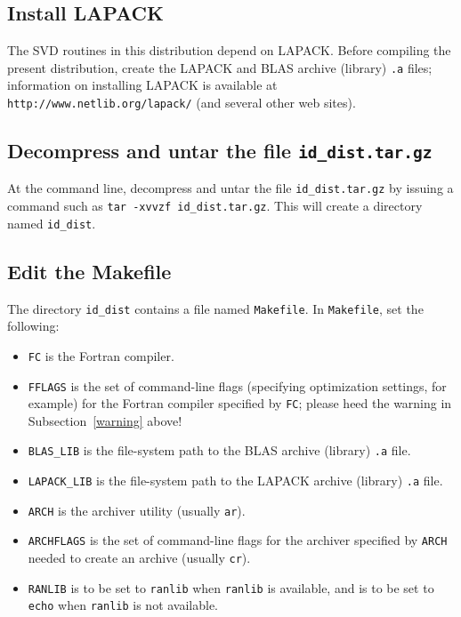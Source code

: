 \documentclass[letterpaper,12pt]{article}
\begin{document}
\subsection{Install LAPACK}

The SVD routines in this distribution depend on LAPACK.
Before compiling the present distribution,
create the LAPACK and BLAS archive (library) {\tt .a} files;
information on installing LAPACK is available
at {\tt http://www.netlib.org/lapack/} (and several other web sites).


\subsection{Decompress and untar the file {\tt id\_dist.tar.gz}}

At the command line, decompress and untar the file
{\tt id\_dist.tar.gz} by issuing a command such as
{\tt tar -xvvzf id\_dist.tar.gz}.
This will create a directory named {\tt id\_dist}.


\subsection{Edit the Makefile}
\label{makefile_edit}

The directory {\tt id\_dist} contains a file named {\tt Makefile}.
In {\tt Makefile}, set the following:
%
\begin{itemize}
\item {\tt FC} is the Fortran compiler.
\item {\tt FFLAGS} is the set of command-line flags
      (specifying optimization settings, for example)
      for the Fortran compiler specified by {\tt FC};
      please heed the warning in Subsection~\ref{warning} above!
\item {\tt BLAS\_LIB} is the file-system path to the BLAS archive
      (library) {\tt .a} file.
\item {\tt LAPACK\_LIB} is the file-system path to the LAPACK archive
      (library) {\tt .a} file.
\item {\tt ARCH} is the archiver utility (usually {\tt ar}).
\item {\tt ARCHFLAGS} is the set of command-line flags
      for the archiver specified by {\tt ARCH} needed
      to create an archive (usually {\tt cr}).
\item {\tt RANLIB} is to be set to {\tt ranlib}
      when {\tt ranlib} is available, and is to be set to {\tt echo}
      when {\tt ranlib} is not available.
\end{itemize}
\end{document}

